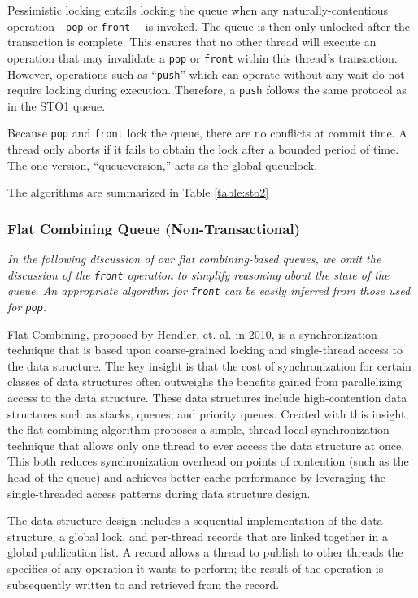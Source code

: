 Pessimistic locking entails locking the queue when any naturally-contentious operation---\texttt{pop} or \texttt{front}--- is invoked. The queue is then only unlocked after the transaction is complete. This ensures that no other thread will execute an operation that may invalidate a \texttt{pop} or \texttt{front} within this thread’s transaction. However, operations such as “\texttt{push}” which can operate without any wait do not require locking during execution. Therefore, a \texttt{push} follows the same protocol as in the STO1 queue.

Because \texttt{pop} and \texttt{front} lock the queue, there are no conflicts at commit time. A thread only aborts if it fails to obtain the lock after a bounded period of time. The one version, “queueversion,” acts as the global queuelock. 

The algorithms are summarized in Table \ref{table:sto2}

\subsubsection{Flat Combining Queue (Non-Transactional)}

\emph{In the following discussion of our flat combining-based queues, we omit the discussion of the \texttt{front} operation to simplify reasoning about the state of the queue. An appropriate algorithm for \texttt{front} can be easily inferred from those used for \texttt{pop}.}

Flat Combining, proposed by Hendler, et. al. in 2010\cite{flatcombining}, is a synchronization technique that is based upon coarse-grained locking and single-thread access to the data structure. The key insight is that the cost of synchronization for certain classes of data structures often outweighs the benefits gained from parallelizing access to the data structure. These data structures include high-contention data structures such as stacks, queues, and priority queues. Created with this insight, the flat combining algorithm proposes a simple, thread-local synchronization technique that allows only one thread to ever access the data structure at once. This both reduces synchronization overhead on points of contention (such as the head of the queue) and achieves better cache performance by leveraging the single-threaded access patterns during data structure design.

The data structure design includes a sequential implementation of the data structure, a global lock, and per-thread records that are linked together in a global publication list. A record allows a thread to publish to other threads the specifics of any operation it wants to perform; the result of the operation is subsequently written to and retrieved from the record.

